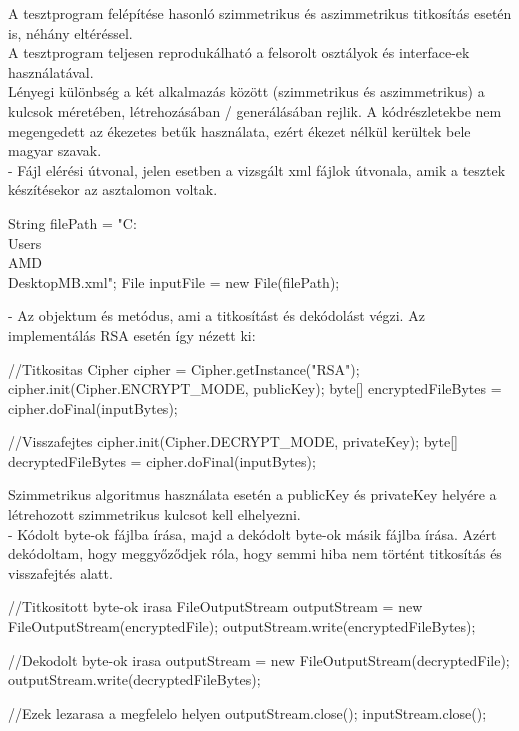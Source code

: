 \vspace{10pt} \noindent A tesztprogram felépítése hasonló szimmetrikus és aszimmetrikus titkosítás esetén is, néhány eltéréssel.
\\A tesztprogram teljesen reprodukálható a felsorolt osztályok és interface-ek használatával.
\vspace{5pt}\\ Lényegi különbség a két alkalmazás között (szimmetrikus és aszimmetrikus) a kulcsok méretében, létrehozásában / generálásában rejlik. A kódrészletekbe nem megengedett az ékezetes betűk használata, ezért ékezet nélkül kerültek bele magyar szavak.
\vspace{5pt}\\ - Fájl elérési útvonal, jelen esetben a vizsgált xml fájlok útvonala, amik a tesztek készítésekor az asztalomon voltak.
\begin{java}
String filePath = "C:\\Users\\AMD\\Desktop\2MB.xml";
File inputFile = new File(filePath);
\end{java}
\vspace{5pt}- Az objektum és metódus, ami a titkosítást és dekódolást végzi. Az implementálás RSA esetén így nézett ki:
\begin{java}
//Titkositas
Cipher cipher = Cipher.getInstance("RSA");
cipher.init(Cipher.ENCRYPT_MODE, publicKey);
byte[] encryptedFileBytes = cipher.doFinal(inputBytes);

//Visszafejtes
cipher.init(Cipher.DECRYPT_MODE, privateKey);
byte[] decryptedFileBytes = cipher.doFinal(inputBytes);
\end{java}
Szimmetrikus algoritmus használata esetén a publicKey és privateKey helyére a létrehozott szimmetrikus kulcsot kell elhelyezni.
\vspace{15pt}\\ - Kódolt byte-ok fájlba írása, majd a dekódolt byte-ok másik fájlba írása. Azért dekódoltam, hogy meggyőződjek róla, hogy semmi hiba nem történt titkosítás és visszafejtés alatt.
\begin{java}
//Titkositott byte-ok irasa
FileOutputStream outputStream = 
			new FileOutputStream(encryptedFile);
outputStream.write(encryptedFileBytes);
	
//Dekodolt byte-ok irasa
outputStream = new FileOutputStream(decryptedFile);
outputStream.write(decryptedFileBytes);
	
//Ezek lezarasa a megfelelo helyen
outputStream.close();
inputStream.close();
\end{java}
